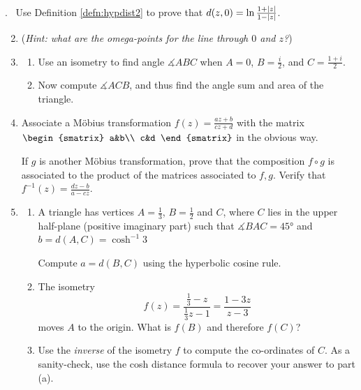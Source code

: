 \goodbreak



\begin{exercises}
	\hangindent{}. \ Use Definition \ref{defn:hypdist2} to prove that $d(z,0)=\ln\frac{1+\left| z\right|}{1-\left| z\right|}$.\vspace{-5pt}
	\begin{enumerate}\setcounter{enumi}{1}
	  \item[](\emph{Hint: what are the omega-points for the line through $0$ and $z$?})
	  
	  \item\begin{enumerate}
	    \item Use an isometry to find angle $\measuredangle ABC$ when $A=0$, $B=\frac i2$, and $C=\frac{1+i}2$.
	    \item Now compute $\measuredangle ACB$, and thus find the angle sum and area of the triangle.
	  \end{enumerate} 
	
	  \item Associate a Möbius transformation $f(z)=\frac{az+b}{cz+d}$ with the matrix
	  $\begin{smatrix}
	  	a&b\\
	  	c&d
	  \end{smatrix}$
	  in the obvious way.\par
	  If $g$ is another Möbius transformation, prove that the composition $f\circ g$ is associated to the product of the matrices associated to $f,g$. Verify\footnotemark{} that $f^{-1}(z)=\frac{dz-b}{a-cz}$.
	  
	  \item\begin{enumerate}
	    \item A triangle has vertices $A=\frac 13$, $B=\frac 12$ and $C$, where $C$ lies in the upper half-plane (positive imaginary part) such that $\measuredangle{BAC}=\ang{45}$ and $b=d(A,C)=\cosh^{-1}3$\par
	    Compute $a=d(B,C)$ using the hyperbolic cosine rule.
	    
	    \item The isometry
	    \[
	    	f(z)=\frac{\frac 13-z}{\frac 13z-1}=\frac{1-3z}{z-3}
	    \]
	    moves $A$ to the origin. What is $f(B)$ and therefore $f(C)$?%
	    
	    \item Use the \emph{inverse} of the isometry $f$ to compute the co-ordinates of $C$. As a sanity-check, use the cosh distance formula to recover your answer to part (a).    
	  \end{enumerate}
	  

\end{enumerate}
\end{exercises}
